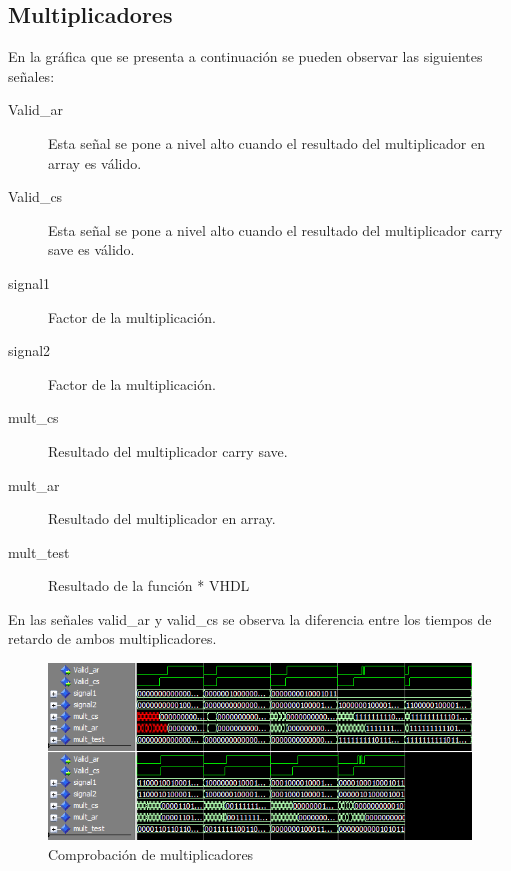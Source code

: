 \documentclass[a4paper,12pt]{article}
\begin{document}
\subsection{Multiplicadores}
En la gráfica que se presenta a continuación se pueden observar las siguientes señales:
\begin{description}
\item[Valid\_ar] Esta señal se pone a nivel alto cuando el resultado del multiplicador en array es válido.
\item[Valid\_cs] Esta señal se pone a nivel alto cuando el resultado del multiplicador carry save es válido.
\item[signal1] Factor de la multiplicación.
\item[signal2] Factor de la multiplicación.
\item[mult\_cs] Resultado del multiplicador carry save.
\item[mult\_ar] Resultado del multiplicador en array.
\item[mult\_test] Resultado de la función * VHDL
\end{description}
En las señales valid\_ar y valid\_cs se observa la diferencia entre los tiempos de retardo de ambos multiplicadores.
\begin{figure}[hbt]
\begin{center}
\includegraphics[width=\textwidth]{img/multiplier_test.png} 
\caption{Comprobación de multiplicadores} \label{fig:multipliertest}
\end{center}
\end{figure}
\end{document}
